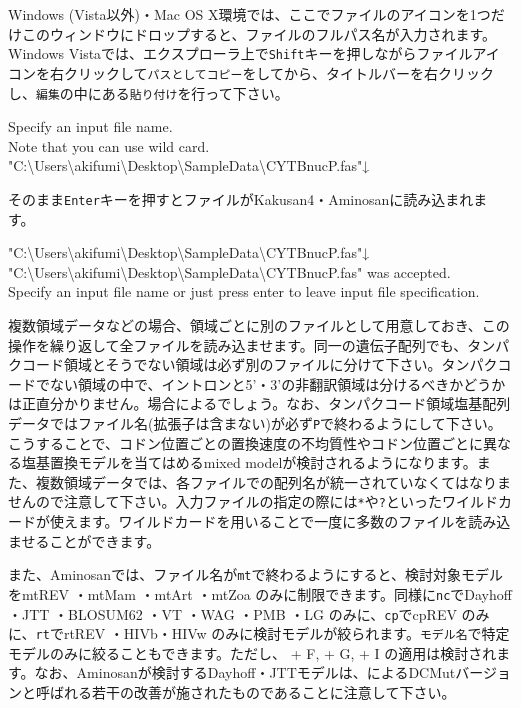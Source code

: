 \documentclass[titlepage,10pt,a4paper]{jsbook}
\newenvironment{cmd}{\begin{oframed}\raggedright\ttfamily\footnotesize\setlength{\baselineskip}{1.4em}}{\end{oframed}\vspace{-1em}}
\begin{document}
Windows (Vista以外)・Mac OS X環境では、ここでファイルのアイコンを1つだけこのウィンドウにドロップすると、ファイルのフルパス名が入力されます。Windows Vistaでは、エクスプローラ上で\texttt{Shift}キーを押しながらファイルアイコンを右クリックして\texttt{パスとしてコピー}をしてから、タイトルバーを右クリックし、\texttt{編集}の中にある\texttt{貼り付け}を行って下さい。
\begin{cmd}
Specify an input file name.\\
Note that you can use wild card.\\
"C:{\textbackslash}Users{\textbackslash}akifumi{\textbackslash}Desktop{\textbackslash}SampleData{\textbackslash}CYTBnuc{\textunderscore}P.fas"↓
\end{cmd}
そのまま\texttt{Enter}キーを押すとファイルがKakusan4・Aminosanに読み込まれます。
\begin{cmd}
"C:{\textbackslash}Users{\textbackslash}akifumi{\textbackslash}Desktop{\textbackslash}SampleData{\textbackslash}CYTBnuc{\textunderscore}P.fas"↓\\
"C:{\textbackslash}Users{\textbackslash}akifumi{\textbackslash}Desktop{\textbackslash}SampleData{\textbackslash}CYTBnuc{\textunderscore}P.fas" was accepted.\\
Specify an input file name or just press enter to leave input file specification.
\end{cmd}
複数領域データなどの場合、領域ごとに別のファイルとして用意しておき、この操作を繰り返して全ファイルを読み込ませます。同一の遺伝子配列でも、タンパクコード領域とそうでない領域は必ず別のファイルに分けて下さい。タンパクコードでない領域の中で、イントロンと5'・3'の非翻訳領域は分けるべきかどうかは正直分かりません。場合によるでしょう。なお、タンパクコード領域塩基配列データではファイル名(拡張子は含まない)が必ず\texttt{{\textunderscore}P}で終わるようにして下さい。こうすることで、コドン位置ごとの置換速度の不均質性やコドン位置ごとに異なる塩基置換モデルを当てはめるmixed modelが検討されるようになります。また、複数領域データでは、各ファイルでの配列名が統一されていなくてはなりませんので注意して下さい。入力ファイルの指定の際には\texttt{*}や\texttt{?}といったワイルドカードが使えます。ワイルドカードを用いることで一度に多数のファイルを読み込ませることができます。

また、Aminosanでは、ファイル名が\texttt{{\textunderscore}mt}で終わるようにすると、検討対象モデルをmtREV \citep{Adachi1996}・mtMam \citep{Cao1998}・mtArt \citep{Abascal2007}・mtZoa \citep{Rota-Stabelli2009}のみに制限できます。同様に\texttt{{\textunderscore}nc}でDayhoff \citep{Dayhoff1978}・JTT \citep{Jones1992}・BLOSUM62 \citep{Henikoff1992}・VT \citep{Muller2000}・WAG \citep{Whelan2001}・PMB \citep{Veerassamy2003}・LG \citep{Le2008}のみに、\texttt{{\textunderscore}cp}でcpREV \citep{Adachi2000}のみに、\texttt{{\textunderscore}rt}でrtREV \citep{Dimmic2002}・HIVb・HIVw \citep{Nickle2007}のみに検討モデルが絞られます。\texttt{{\textunderscore}モデル名}で特定モデルのみに絞ることもできます。ただし、 + F, + G, + I の適用は検討されます。なお、Aminosanが検討するDayhoff・JTTモデルは、\citet{Kosiol2005}によるDCMutバージョンと呼ばれる若干の改善が施されたものであることに注意して下さい。
\end{document}
